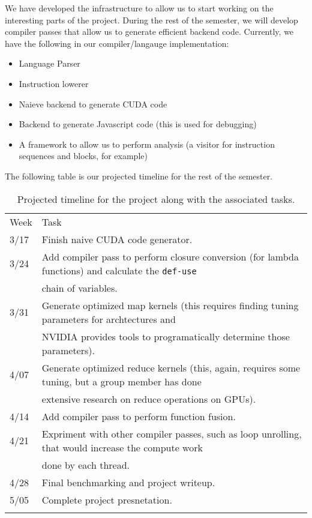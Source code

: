 We have developed the infrastructure to allow us to start working on the
interesting parts of the project. During the rest of the semester, we
will develop compiler passes that allow us to generate efficient backend
code. Currently, we have the following in our compiler/langauge
implementation:

\begin{itemize}
\itemsep1pt\parskip0pt
\item
  Language Parser
\item
  Instruction lowerer
\item
  Naieve backend to generate CUDA code
\item
  Backend to generate Javascript code (this is used for debugging)
\item
  A framework to allow us to perform analysis (a visitor for instruction
  sequences and blocks, for example)
\end{itemize}

The following table is our projected timeline for the rest of the
semester.

\begin{longtable}[c]{@{}ll@{}}
\hline\noalign{\medskip}
Week & Task
\\\noalign{\medskip}
\hline\noalign{\medskip}
3/17 & Finish naive CUDA code generator.
\\\noalign{\medskip}
3/24 & Add compiler pass to perform closure conversion (for lambda
functions) and calculate the \texttt{def-use}
\\\noalign{\medskip}
& chain of variables.
\\\noalign{\medskip}
3/31 & Generate optimized map kernels (this requires finding tuning
parameters for archtectures and
\\\noalign{\medskip}
& NVIDIA provides tools to programatically determine those parameters).
\\\noalign{\medskip}
4/07 & Generate optimized reduce kernels (this, again, requires some
tuning, but a group member has done
\\\noalign{\medskip}
& extensive research on reduce operations on GPUs).
\\\noalign{\medskip}
4/14 & Add compiler pass to perform function fusion.
\\\noalign{\medskip}
4/21 & Expriment with other compiler passes, such as loop unrolling,
that would increase the compute work
\\\noalign{\medskip}
& done by each thread.
\\\noalign{\medskip}
4/28 & Final benchmarking and project writeup.
\\\noalign{\medskip}
5/05 & Complete project presnetation.
\\\noalign{\medskip}
\hline
\noalign{\medskip}
\caption{Projected timeline for the project along with the associated
tasks.}
\end{longtable}

